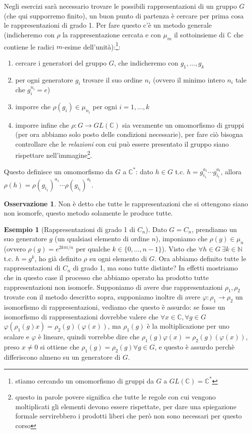 \documentclass[11pt]{article}
\theoremstyle{plain}
\theoremstyle{definition}
\newtheorem{exmp}{Esempio}[section]
\newtheorem*{rem}{Osservazione}
\theoremstyle{remark}
\newcommand{\C}{\mathbb{C}}
\newcommand{\N}{\mathbb{N}}
\begin{document}
Negli esercizi sarà necessario trovare le possibili rappresentazioni di un gruppo $G$ (che qui supporremo finito), un buon punto di partenza è cercare per prima cosa le rappresentazioni di grado 1. Per fare questo c'è un metodo generale (indicheremo con $\rho$ la rappresentazione cercata e con $\mu_m$ il sottoinsieme di $\C$ che contiene le radici $m$-esime dell'unità):\footnote{stiamo cercando un omomorfismo di gruppi da $G$ a $GL(\C)=\C^*$}:
\begin{enumerate}
	\item cercare i generatori del gruppo $G$, che indicheremo con $g_1, \ldots, g_k$
	\item per ogni generatore $g_i$ trovare il suo ordine $n_i$ (ovvero il minimo intero $n_i$ tale che $g_i^{n_i}=e$)
	\item imporre che $\rho(g_i)\in \mu_{n_i}$ per ogni $i=1,\ldots,k$
	\item imporre infine che $\rho:G\to GL(\C)$ sia veramente un omomorfismo di gruppi (per ora abbiamo solo posto delle condizioni necessarie), per fare ciò bisogna controllare che le \textit{relazioni} con cui può essere presentato il gruppo siano rispettare nell'immagine\footnote{questo in parole povere significa che tutte le regole con cui vengono moltiplicati gli elementi devono essere rispettate, per dare una spiegazione formale servirebbero i prodotti liberi che però non sono necessari per questo corso}.
\end{enumerate}
Questo definisce un omomorfismo da $G$ a $\C^*$: dato $h\in G$ t.c. $h=g_{i_1}^{a_1}\cdots g_{i_t}^{a_t}$, allora $\rho(h) = \rho(g_{i_1})^{a_1}\cdots \rho(g_{i_t})^{a_t}$.
\begin{rem}
	Non è detto che tutte le rappresentazioni che si ottengono siano non isomorfe, questo metodo solamente le produce tutte.
\end{rem}


\begin{exmp}[Rappresentazioni di grado 1 di $C_n$]
Dato $G=C_n$, prendiamo un suo generatore $g$ (un qualsiasi elemento di ordine $n$), imponiamo che $\rho(g)\in \mu_n$ (ovvero $\rho(g)=e^{2k\pi i/n}$ per qualche $k\in \{0,\ldots,n-1\}$). Visto che $\forall h\in G\ \exists k\in \N$ t.c. $h=g^k$, ho già definito $\rho$ su ogni elemento di $G$.\newline
Ora abbiamo definito tutte le rappresentazioni di $C_n$ di grado 1, ma sono tutte distinte? In effetti mostriamo che in questo case il processo che abbiamo operato ha prodotto tutte rappresentazioni non isomorfe. Supponiamo di avere due rappresentazioni $\rho_1, \rho_2$ trovate con il metodo descritto sopra, supponiamo inoltre di avere $\varphi:\rho_1\to\rho_2$ un isomorfismo di rappresentazioni, vediamo che questo è assurdo: se fosse un isomorfismo di rappresentazioni dovrebbe valere che $\forall x\in \C, \forall g\in G$ $\varphi( \rho_1(g)x ) = \rho_2(g)( \varphi(x) )$, ma $\rho_1(g)$ è la moltiplicazione per uno scalare e $\varphi$ è lineare, quindi vorrebbe dire che $\rho_1(g)\varphi( x ) = \rho_2(g)( \varphi(x) )$, preso $x\neq 0$ si ottiene che $\rho_1(g)=\rho_2(g)\forall g\in G$, e questo è assurdo perchè differiscono almeno su un generatore di $G$.
\end{exmp}
\end{document}
